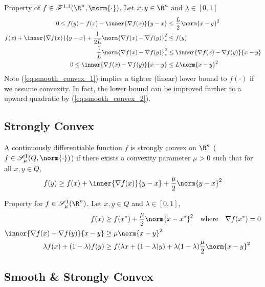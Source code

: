 \documentclass[../summary.tex]{subfiles}
\begin{document}
\noindent Property of $f\in \scrF^{1,1}(\R^n, \norm{\cdot})$. Let $x,y\in\R^n$ and $\lambda \in [0,1]$
\begin{align}
    0 
        \leq f(y) - f(x) - \inner{\nabla f(x)}{y-x}
        &\leq \frac{L}{2}\norm{x-y}^2 
        \label{eq:smooth_convex_1} \\
    f(x) + \inner{\nabla f(x)}{y-x} + \frac{1}{2L} \norm{\nabla f(x)- \nabla f(y)}^2_* 
        &\leq f(y) 
        \label{eq:smooth_convex_2} \\ 
    \frac{1}{L} \norm{\nabla f(x) - \nabla f(y)}_*^2
        &\leq \inner{\nabla f(x) - \nabla f(y)}{x-y} \\
    0 
        \leq \inner{\nabla f(x) - \nabla f(y)}{x-y}
        &\leq L \norm{x-y}^2
\end{align}
Note (\ref{eq:smooth_convex_1}) implies a tighter (linear) lower bound to $f(\cdot)$ if we assume convexity. In fact, the lower bound can be improved further to a upward quadratic by (\ref{eq:smooth_convex_2}).

\subsection{Strongly Convex}

\begin{definition}
    A continuously differentiable function $f$ is strongly convex on $\R^n$ ($f\in \scrS_{\mu}^1(Q,\norm{\cdot})$) if there exists a convexity parameter $\mu > 0$ such that for all $x,y\in Q$, 
    \begin{align}
        f(y)
            \geq f(x) + \inner{\nabla f(x)}{y-x} + \frac{\mu}{2}\norm{y-x}^2
    \end{align}
\end{definition}

\noindent Property for $f \in \scrS_{\mu}^1(\R^n)$. Let $x,y\in Q$ and $\lambda \in [0,1]$,
\begin{align}
    f(x)
        &\geq f(x^*) + \frac{\mu}{2} \norm{x-x^*}^2
        \quad\text{where}\quad
        \nabla f(x^*) = 0
            \label{eq:strongly_convex_1} \\
    \inner{\nabla f(x) - \nabla f(y)}{x-y}
        &\geq \mu \norm{x-y}^2 \\
    \lambda f(x) + (1-\lambda) f(y)
        &\geq f(\lambda x + (1-\lambda )y) + \lambda (1-\lambda )\frac{\mu}{2}\norm{x-y}^2
\end{align}

\subsection{Smooth \& Strongly Convex}
\end{document}
